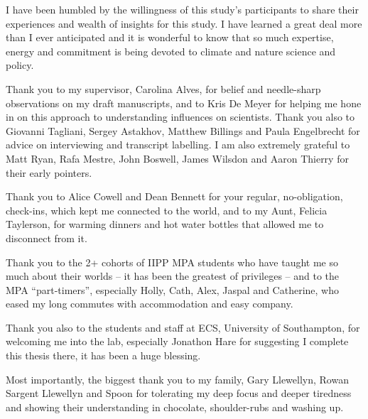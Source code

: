\fi
\begin{acknowledgements}
I have been humbled by the willingness of this study's participants to share their experiences and wealth of insights for this study. I have learned a great deal more than I ever anticipated and it is wonderful to know that so much expertise, energy and commitment is being devoted to climate and nature science and policy. 

Thank you to my supervisor, Carolina Alves, for belief and needle-sharp observations on my draft manuscripts, and to Kris De Meyer for helping me hone in on this approach to understanding influences on scientists. Thank you also to Giovanni Tagliani, Sergey Astakhov, Matthew Billings and Paula Engelbrecht for advice on interviewing and transcript labelling. I am also extremely grateful to Matt Ryan, Rafa Mestre, John Boswell, James Wilsdon and Aaron Thierry for their early pointers.

Thank you to Alice Cowell and Dean Bennett for your regular, no-obligation, check-ins, which kept me connected to the world, and to my Aunt, Felicia Taylerson, for warming dinners and hot water bottles that allowed me to disconnect from it.

Thank you to the 2+ cohorts of IIPP MPA students who have taught me so much about their worlds -- it has been the greatest of privileges -- and to the MPA ``part-timers'', especially Holly, Cath, Alex, Jaspal and Catherine, who eased my long commutes with accommodation and easy company.

Thank you also to the students and staff at ECS, University of Southampton, for welcoming me into the lab, especially Jonathon Hare for suggesting I complete this thesis there, it has been a huge blessing. %

Most importantly, the biggest thank you to my family, Gary Llewellyn, Rowan Sargent Llewellyn and Spoon for tolerating my deep focus and deeper tiredness and showing their understanding in chocolate, shoulder-rubs and washing up.
\end{acknowledgements}


\setcounter{tocdepth}{2} 

\tableofcontents
\listoffigures
\listoftables
%
\printglossary[title=List of Abbreviations,type=\acronymtype]
